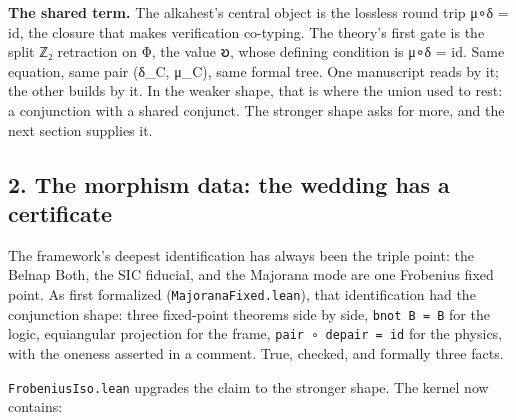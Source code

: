 \documentclass[12pt,a4paper]{article}
\begin{document}
\textbf{The shared term.} The alkahest's central object is the lossless
round trip μ∘δ = id, the closure that makes verification co-typing. The
theory's first gate is the split ℤ₂ retraction on Φ, the value 𐑹, whose
defining condition is μ∘δ = id. Same equation, same pair (δ\_C, μ\_C),
same formal tree. One manuscript reads by it; the other builds by it. In
the weaker shape, that is where the union used to rest: a conjunction
with a shared conjunct. The stronger shape asks for more, and the next
section supplies it.

\hypertarget{the-morphism-data-the-wedding-has-a-certificate}{%
\subsection{2. The morphism data: the wedding has a
certificate}\label{the-morphism-data-the-wedding-has-a-certificate}}

The framework's deepest identification has always been the triple point:
the Belnap Both, the SIC fiducial, and the Majorana mode are one
Frobenius fixed point. As first formalized
(\texttt{MajoranaFixed.lean}), that identification had the conjunction
shape: three fixed-point theorems side by side, \texttt{bnot\ B\ =\ B}
for the logic, equiangular projection for the frame,
\texttt{pair\ ∘\ depair\ =\ id} for the physics, with the oneness
asserted in a comment. True, checked, and formally three facts.

\texttt{FrobeniusIso.lean} upgrades the claim to the stronger shape. The
kernel now contains:
\end{document}

